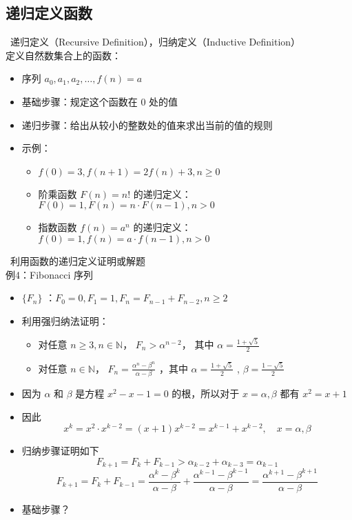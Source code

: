 \documentclass[UTF8]{report}
\theoremstyle{MyLineTheoremStyle} %
\theoremstyle{MyBlockTheoremStyle} %
\theoremstyle{MySubsubsectionStyle} %
\begin{document}
\subsection{递归定义函数}
\textbullet\ 递归定义（Recursive Definition），归纳定义（Inductive Definition）\\
定义自然数集合上的函数：
\begin{itemize}
    \item 序列 $a_0, a_1, a_2, \ldots , f(n) = a$
    \item 基础步骤：规定这个函数在 0 处的值
    \item 递归步骤：给出从较小的整数处的值来求出当前的值的规则
    \item 示例：
    \begin{itemize}
        \item $f(0) = 3, f(n + 1) = 2f(n) + 3, n \geq 0$
        \item 阶乘函数 $F(n) = n!$ 的递归定义：$F(0) = 1, F(n) = n \cdot F(n - 1) , n > 0$
        \item 指数函数 $f(n) = a^n$ 的递归定义：$f(0) = 1, f(n) = a \cdot f(n - 1) , n > 0$
    \end{itemize}
\end{itemize}

\textbullet\ 利用函数的递归定义证明或解题\\
例4：Fibonacci 序列
\begin{itemize}
    \item $\{F_n\}$ ：$F_0 = 0, F_1 = 1, F_n = F_{n-1} + F_{n-2}, n \geq 2$
    \item 利用强归纳法证明：
    \begin{itemize}
        \item 对任意 $n \geq 3, n \in \mathbb{N}$， $F_n > \alpha^{n-2}$， 其中 $\alpha = \frac{1 + \sqrt{5}}{2}$
        \item 对任意 $n \in \mathbb{N}$， $F_n = \frac{\alpha^n - \beta^n}{\alpha - \beta}$ ，其中 $\alpha = \frac{1 + \sqrt{5}}{2}$ , $\beta = \frac{1 - \sqrt{5}}{2}$
    \end{itemize}
    \item 因为 $\alpha$ 和 $\beta$ 是方程 $ x^2 - x - 1 = 0$ 的根，所以对于 $ x = \alpha, \beta$ 都有 $x^2 = x + 1$
    \item 因此
    \[
    x^k = x^2 \cdot x^{k-2} = (x+1)x^{k-2} = x^{k-1} + x^{k-2},\quad x = \alpha, \beta
    \]
    \item 归纳步骤证明如下
    \[
    F_{k+1} = F_k + F_{k-1} > \alpha_{k-2} + \alpha_{k-3} = \alpha_{k-1}
    \]
    \[
    F_{k+1} = F_k + F_{k-1} = \frac{\alpha^k - \beta^k}{\alpha - \beta} + \frac{\alpha^{k-1} - \beta^{k-1}}{\alpha - \beta} = \frac{\alpha^{k+1} - \beta^{k+1}}{\alpha - \beta}
    \]
    \item 基础步骤？
\end{itemize}
\end{document}
